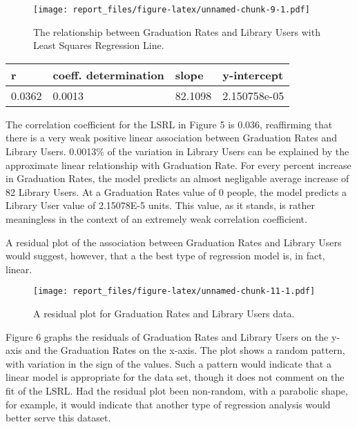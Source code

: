 \documentclass[12pt,]{article}
\begin{document}
\vspace{20pt}

\begin{figure}[htbp]
\centering
\texttt{[image: report\_files/figure-latex/unnamed-chunk-9-1.pdf]}
\caption{The relationship between Graduation Rates and Library Users
with Least Squares Regression Line.}
\end{figure}

\begin{longtable}[]{@{}llll@{}}
\toprule
r & coeff. determination & slope & y-intercept\tabularnewline
\midrule
\endhead
0.0362 & 0.0013 & 82.1098 & 2.150758e-05\tabularnewline
\bottomrule
\end{longtable}

\vspace{0pt}

The correlation coefficient for the LSRL in Figure 5 is 0.036,
reaffirming that there is a very weak positive linear association
between Graduation Rates and Library Users. 0.0013\% of the variation in
Library Users can be explained by the approximate linear relationship
with Graduation Rate. For every percent increase in Graduation Rates,
the model predicts an almost negligable average increase of 82 Library
Users. At a Graduation Rates value of 0 people, the model predicts a
Library User value of 2.15078E-5 units. This value, as it stands, is
rather meaningless in the context of an extremely weak correlation
coefficient.

A residual plot of the association between Graduation Rates and Library
Users would suggest, however, that a the best type of regression model
is, in fact, linear.

\vspace{20pt}

\begin{figure}[htbp]
\centering
\texttt{[image: report\_files/figure-latex/unnamed-chunk-11-1.pdf]}
\caption{A residual plot for Graduation Rates and Library Users data.}
\end{figure}

\vspace{0pt}

Figure 6 graphs the residuals of Graduation Rates and Library Users on
the y-axis and the Graduation Rates on the x-axis. The plot shows a
random pattern, with variation in the sign of the values. Such a pattern
would indicate that a linear model is appropriate for the data set,
though it does not comment on the fit of the LSRL. Had the residual plot
been non-random, with a parabolic shape, for example, it would indicate
that another type of regression analysis would better serve this
dataset.
\end{document}
